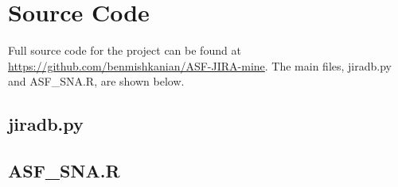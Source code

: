 \chapter{Source Code}
Full source code for the project can be found at \url{https://github.com/benmishkanian/ASF-JIRA-mine}. The main files, jiradb.py and ASF\_SNA.R, are shown below.
\section{jiradb.py}
\lstset{basicstyle=\tiny, breaklines=true}

\section{ASF\_SNA.R}
